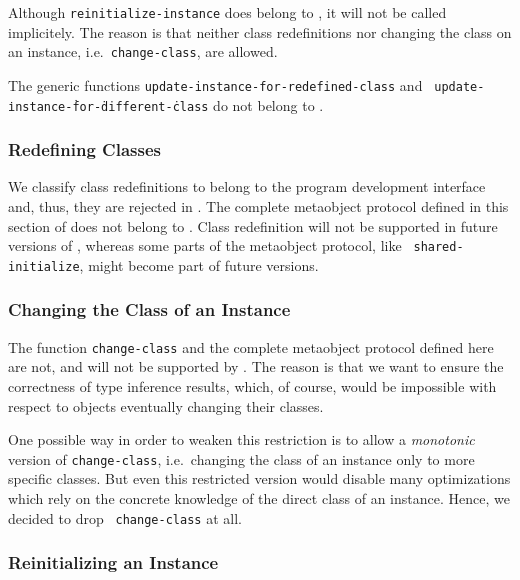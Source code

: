 Although {\tt reinitialize-instance} does belong to , it will not be 
called implicitely. The reason is that neither class redefinitions nor 
changing the class on an instance, i.e.\ {\tt change-class}, are allowed.

The generic functions {\tt update-\-instance-\-for-\-redefined-\-class} and {\tt 
update-\.instance-\.for-\.different-\.class} do not belong to .

\subsubsection{Redefining Classes}
\label{classredefine}

We classify class redefinitions to belong to the program development 
interface and, thus, they are rejected in . The complete metaobject 
protocol defined in this section of \cite{Steele90} does not belong to 
. Class redefinition will not be supported in future versions of 
, whereas some parts of the metaobject protocol, like {\tt 
shared-initialize}, might become part of future versions.

\subsubsection{Changing the Class of an Instance}
\label{changeclass}

The function {\tt change-class} and the complete metaobject protocol 
defined here are not, and will not be supported by . The reason is 
that we want to ensure the correctness of type inference results, which, of 
course, would be impossible with respect to objects eventually changing 
their classes.

One possible way in order to weaken this restriction is to allow a {\em 
monotonic} version of {\tt change-class}, i.e.\ changing the class of an 
instance only to more specific classes. But even this restricted version 
would disable many optimizations which rely on the concrete knowledge of 
the direct class of an instance. Hence, we decided to drop {\tt 
change-class} at all.

\subsubsection{Reinitializing an Instance}
\label{reinitialize}

